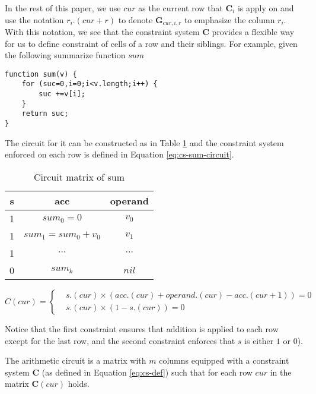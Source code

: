 In the rest of this paper, we use $cur$ as the current row that $\mathbf{C}_i$ is apply on and use the notation $r_i.(cur + r)$ to denote $\mathbf{G}_{cur, i, r}$ to emphasize the column $r_i$. With this notation, we see that the constraint system $\mathbf{C}$ provides a flexible way for us to define constraint of cells of a row and their siblings. For example, given the following summarize function $sum$
\begin{verbatim}
function sum(v) {
    for (suc=0,i=0;i<v.length;i++) {
        suc +=v[i];
    }
    return suc;
}
\end{verbatim}
The circuit for it can be constructed as in Table \ref{tbl:sum-table} and the constraint system enforced on each row is defined in Equation \ref{eq:cs-sum-circuit}.
\begin{table}[!h]
\begin{center}
\caption{Circuit matrix of sum}
\label{tbl:sum-table}
\begin{tabular}{ | c | c | c |}
  \hline
  s & acc & operand \\ 
  \hline
 1 & $sum_0 = 0$ & $v_0$\\
 \hline
 1 & $sum_1 = sum_0 + v_0$ & $v_1$\\
 \hline
 1 & $\cdots$ & $\cdots$\\
 \hline
 0 & $sum_k$ & $nil$\\
 \hline
\end{tabular}
\end{center}
\end{table}

\begin{equation}
 C(cur) = \begin{cases}
     &s.(cur) \times (acc.(cur) + operand.(cur) - acc.(cur+1)) = 0 \\
     &s.(cur) \times (1-s.(cur)) = 0
 \end{cases}
 \label{eq:cs-sum-circuit}
\end{equation}
\begin{remark}
Notice that the first constraint ensures that addition is applied to each row except for the last row, and the second constraint enforces that $s$ is either $1$ or $0$).
\end{remark}

\begin{definition}
The arithmetic circuit is a matrix with $m$ columns equipped with a constraint system $\mathbf{C}$ (as defined in Equation \ref{eq:cs-def}) such that for each row $cur$ in the matrix $\mathbf{C}(cur)$ holds.
\end{definition}


